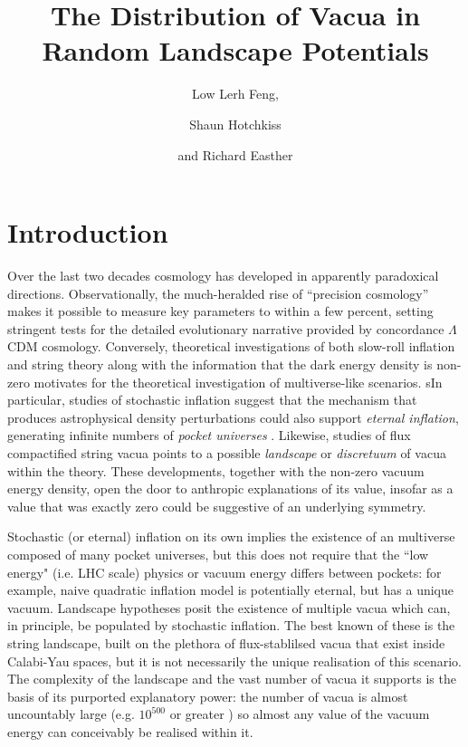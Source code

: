 \documentclass[12pt]{article}
\title{The Distribution of Vacua in Random Landscape Potentials}
\author{Low Lerh Feng,}
\author{Shaun Hotchkiss}
\author{and Richard Easther}
\affiliation{Department of Physics,\\ University of Auckland, \\Private Bag 92019,\\ Auckland, New Zealand}
\begin{document}
\maketitle

\section{Introduction}

Over the last two decades cosmology has developed in apparently paradoxical directions. Observationally, the much-heralded rise of ``precision cosmology'' makes it possible to measure key parameters to within a few percent, setting stringent tests for the detailed evolutionary narrative provided by concordance $\Lambda$CDM cosmology\cite{Planck2018,DES}. Conversely, theoretical investigations of both slow-roll inflation and string theory along with the information that the dark energy density is non-zero motivates for the theoretical investigation of multiverse-like scenarios. sIn particular, studies of stochastic inflation \cite{Linde1986,Adshead2007} suggest that the mechanism that produces astrophysical density perturbations could also support {\em eternal inflation\/}, generating infinite numbers of  {\em pocket universes\/} \cite{Guth2001}. Likewise, studies of flux compactified string vacua points to a possible  {\em landscape\/} \cite{Susskind2003} or {\em discretuum\/} \cite{Bousso2000}   of vacua within the theory. These developments, together with the non-zero vacuum energy density, open the door to anthropic explanations of its value, insofar as a value that was  exactly zero could be suggestive of an underlying symmetry. 

Stochastic (or eternal) inflation on its own implies the existence of an multiverse composed of many pocket universes, but this does not require that the ``low energy" (i.e. LHC scale) physics or vacuum energy differs between pockets: for example, naive quadratic inflation model is potentially eternal, but has a unique vacuum.  Landscape hypotheses posit the existence of multiple vacua which can, in principle, be populated by stochastic inflation. The best known of these is the string landscape, built on the plethora of flux-stablilsed vacua that exist inside Calabi-Yau spaces, but it is not necessarily the unique realisation of this scenario. The complexity of the landscape  and the vast number of vacua it supports is the basis of its purported explanatory power: the number of vacua is almost uncountably large (e.g. $10^{500}$ or greater \cite{Douglas}) so almost any value of the vacuum energy can conceivably be realised within it. 
 
\end{document}
